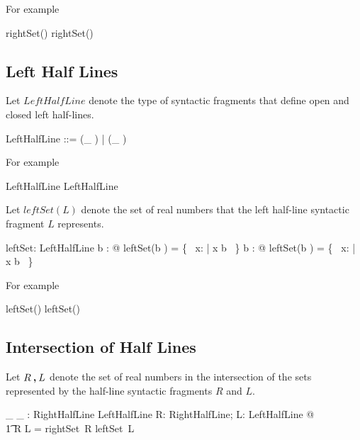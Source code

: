 \documentclass{amsart}
\begin{document}
For example

\begin{zed}
	\zeroR \notin rightSet(\openLowerBound \zeroR)
\also
	\oneR \in rightSet(\closedLowerBound \oneR)
\end{zed}

\subsection{Left Half Lines}

Let $LeftHalfLine$ denote the type of syntactic fragments that define open and closed left half-lines.

\begin{zed}
	LeftHalfLine ::= (\_ \openUpperBound)  \ldata \R \rdata | (\_ \closedUpperBound)  \ldata \R \rdata
\end{zed}

For example

\begin{zed}
	\zeroR \openUpperBound \in LeftHalfLine
\also
	\oneR \closedUpperBound \in LeftHalfLine
\end{zed}

Let $leftSet(L)$ denote the set of real numbers that the left half-line syntactic fragment $L$ represents.

\begin{axdef}
	leftSet: LeftHalfLine \fun \power \R
\where
	\forall b : \R @ leftSet(b \openUpperBound) = \{~ x: \R | x \ltR b ~\}
\also
	\forall b : \R @ leftSet(b \closedUpperBound) = \{~ x: \R | x \leR b ~\}
\end{axdef}

For example

\begin{zed}
	\zeroR \notin leftSet(\zeroR \openUpperBound)
\also
	\oneR \in leftSet(\oneR \closedUpperBound)
\end{zed}

\subsection{Intersection of Half Lines}

Let $R \mathbin{\boldsymbol{,}} L$ denote the set of real numbers in the intersection of the sets represented by
the half-line syntactic fragments $R$ and $L$.

\begin{axdef}
	\_ \intersectRightLeft \_ : RightHalfLine \cross LeftHalfLine \fun \power \R
\where
	\forall R: RightHalfLine; L: LeftHalfLine @ \\
	\t1	R \intersectRightLeft L = rightSet~R \cap leftSet~L
\end{axdef}
\end{document}
